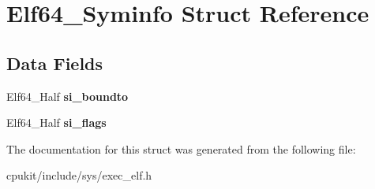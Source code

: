 \hypertarget{structElf64__Syminfo}{}\section{Elf64\+\_\+\+Syminfo Struct Reference}
\label{structElf64__Syminfo}
\subsection*{Data Fields}
\begin{DoxyCompactItemize}
\item 
\mbox{\label{structElf64__Syminfo_a919d1c0dd96fae4b828902b765097e15}} 
Elf64\+\_\+\+Half {\bfseries si\+\_\+boundto}
\item 
\mbox{\label{structElf64__Syminfo_a919ad3ae58e391cb2cf9da819d9d1344}} 
Elf64\+\_\+\+Half {\bfseries si\+\_\+flags}
\end{DoxyCompactItemize}


The documentation for this struct was generated from the following file\+:\begin{DoxyCompactItemize}
\item 
cpukit/include/sys/exec\+\_\+elf.\+h\end{DoxyCompactItemize}
